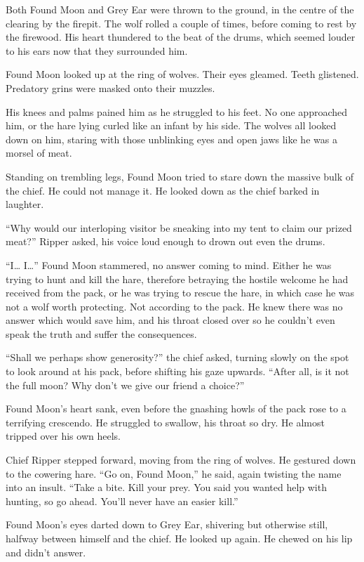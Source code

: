 Both Found Moon and Grey Ear were thrown to the ground, in the centre of the clearing by the firepit. The wolf rolled a couple of times, before coming to rest by the firewood. His heart thundered to the beat of the drums, which seemed louder to his ears now that they surrounded him.

Found Moon looked up at the ring of wolves. Their eyes gleamed. Teeth glistened. Predatory grins were masked onto their muzzles.

His knees and palms pained him as he struggled to his feet. No one approached him, or the hare lying curled like an infant by his side. The wolves all looked down on him, staring with those unblinking eyes and open jaws like he was a morsel of meat.

Standing on trembling legs, Found Moon tried to stare down the massive bulk of the chief. He could not manage it. He looked down as the chief barked in laughter.

``Why would our interloping visitor be sneaking into my tent to claim our prized meat?'' Ripper asked, his voice loud enough to drown out even the drums.

``I\ldots{} I\ldots'' Found Moon stammered, no answer coming to mind. Either he was trying to hunt and kill the hare, therefore betraying the hostile welcome he had received from the pack, or he was trying to rescue the hare, in which case he was not a wolf worth protecting. Not according to the pack. He knew there was no answer which would save him, and his throat closed over so he couldn't even speak the truth and suffer the consequences.

``Shall we perhaps show generosity?'' the chief asked, turning slowly on the spot to look around at his pack, before shifting his gaze upwards. ``After all, is it not the full moon? Why don't we give our friend a choice?''

Found Moon's heart sank, even before the gnashing howls of the pack rose to a terrifying crescendo. He struggled to swallow, his throat so dry. He almost tripped over his own heels.

Chief Ripper stepped forward, moving from the ring of wolves. He gestured down to the cowering hare. ``Go on, Found Moon,'' he said, again twisting the name into an insult. ``Take a bite. Kill your prey. You said you wanted help with hunting, so go ahead. You'll never have an easier kill.''

Found Moon's eyes darted down to Grey Ear, shivering but otherwise still, halfway between himself and the chief. He looked up again. He chewed on his lip and didn't answer.

